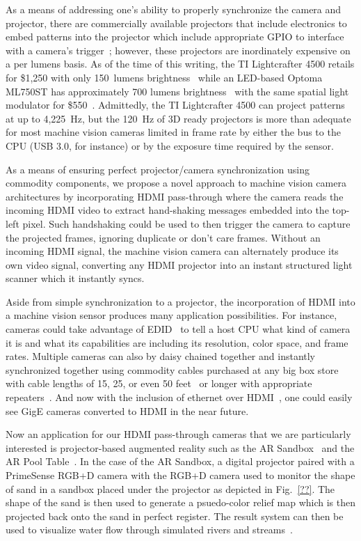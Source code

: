 \documentclass[]{spie}  %
\begin{document}
As a means of addressing one's ability to properly synchronize the camera and projector, there are commercially available projectors that include electronics to embed patterns into the projector which include appropriate GPIO to interface with a camera's trigger~\cite{glop18, ajil18, lcft18}; however, these projectors are inordinately expensive on a per lumens basis.  As of the time of this writing, the TI Lightcrafter 4500 retails for \$1,250 with only 150~lumens brightness~\cite{tilc17} while an LED-based Optoma ML750ST has approximately 700 lumens brightness~\cite{lume70} with the same spatial light modulator for \$550~\cite{ml75st}. Admittedly, the TI Lightcrafter 4500 can project patterns at up to 4,225~Hz, but the 120~Hz of 3D ready projectors is more than adequate for most machine vision cameras limited in frame rate by either the bus to the CPU (USB 3.0, for instance) or by the exposure time required by the sensor.

As a means of ensuring perfect projector/camera synchronization using commodity components, we propose a novel approach to machine vision camera architectures by incorporating HDMI pass-through where the camera reads the incoming HDMI video to extract hand-shaking messages embedded into the top-left pixel. Such handshaking could be used to then trigger the camera to capture the projected frames, ignoring duplicate or don't care frames.  Without an incoming HDMI signal, the machine vision camera can alternately produce its own video signal, converting any HDMI projector into an instant structured light scanner which it instantly syncs.  

Aside from simple synchronization to a projector, the incorporation of HDMI into a machine vision sensor produces many application possibilities. For instance, cameras could take advantage of EDID~\cite{edid00} to tell a host CPU what kind of camera it is and what its capabilities are including its resolution, color space, and frame rates.  Multiple cameras can also by daisy chained together and instantly synchronized together using commodity cables purchased at any big box store with cable lengths of 15, 25, or even 50 feet~\cite{hdmi50} or longer with appropriate repeaters~\cite{repe00}. And now with the inclusion of ethernet over HDMI~\cite{hdmi14}, one could easily see GigE cameras converted to HDMI in the near future.

Now an application for our HDMI pass-through cameras that we are particularly interested is projector-based augmented reality such as the AR Sandbox~\cite{wood16} and the AR Pool Table~\cite{uchi08}. In the case of the AR Sandbox, a digital projector paired with a PrimeSense RGB+D camera with the RGB+D camera used to monitor the shape of sand in a sandbox placed under the projector as depicted in Fig.~\ref{??}.  The shape of the sand is then used to generate a psuedo-color relief map which is then projected back onto the sand in perfect register.  The result system can then be used to visualize water flow through simulated rivers and streams~\cite{afro18}.  
\end{document}
